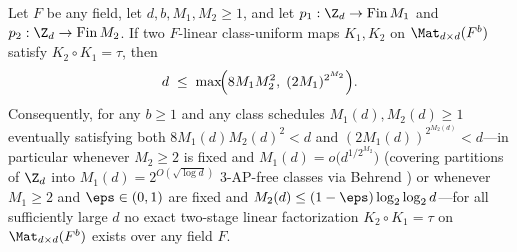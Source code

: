 \begin{theorem}\label{thm:2a}
Let $F$ be any field, let $d, b, M_1, M_2 \ge 1$, and let $p_1 : \Z_d \to \mathrm{Fin}\,M_1$ and
$p_2 : \Z_d \to \mathrm{Fin}\,M_2$. If two $F$-linear class-uniform maps $K_1, K_2$ on
$\Mat_{d\times d}(F^b)$ satisfy $K_2 \circ K_1 = \tau$, then
\[
  d \;\le\; \max\!\Bigl(8 M_1 M_2^2,\; (2 M_1)^{2^{M_2}}\Bigr).
\]
Consequently, for any $b \ge 1$ and any class schedules $M_1(d), M_2(d) \ge 1$ eventually satisfying
both $8 M_1(d) M_2(d)^2 < d$ and $(2 M_1(d))^{2^{M_2(d)}} < d$---in particular whenever $M_2 \ge 2$ is
fixed and $M_1(d) = o\bigl(d^{1/2^{M_2}}\bigr)$ (covering partitions of $\Z_d$ into
$M_1(d) = 2^{O(\sqrt{\log d})}$ $3$-AP-free classes via Behrend \cite{Behrend1946}) or whenever
$M_1 \ge 2$ and $\eps \in (0, 1)$ are fixed and $M_2(d) \le (1 - \eps)\log_2\log_2 d$---for all
sufficiently large $d$ no exact two-stage linear factorization $K_2 \circ K_1 = \tau$ on
$\Mat_{d\times d}(F^b)$ exists over any field $F$.
\end{theorem}
